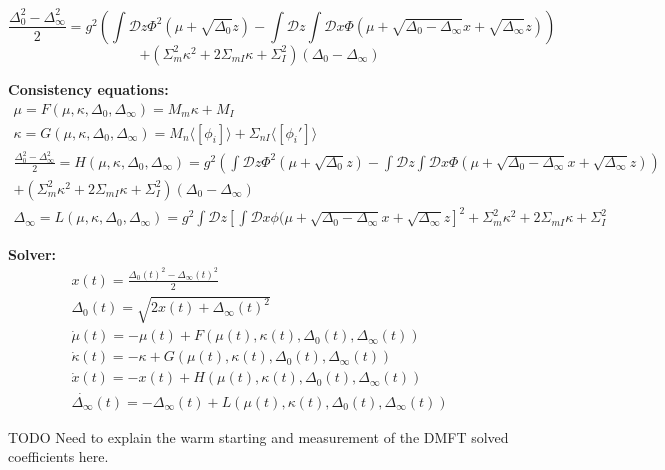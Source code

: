 \documentclass[11pt]{article}
\begin{document}
\[\frac{\Delta_0^2-\Delta_\infty^2}{2} = g^2 \left( \int \mathcal{D}z \Phi^2(\mu + \sqrt{\Delta_0}z) - \int \mathcal{D}z \int \mathcal{D}x \Phi(\mu + \sqrt{\Delta_0 - \Delta_\infty}x + \sqrt{\Delta_\infty}z)  \right) \] 
\[+ (\Sigma_m^2 \kappa^2 + 2\Sigma_{mI} \kappa + \Sigma_I^2)(\Delta_0-\Delta_\infty)\]

\textbf{Consistency equations:} \\ 
\begin{equation}
\begin{split}
\mu = F(\mu, \kappa, \Delta_0, \Delta_\infty) = M_m \kappa + M_I \\
\kappa = G(\mu, \kappa, \Delta_0, \Delta_\infty) = M_n \langle \left[ \phi_i \right] \rangle + \Sigma_{nI} \langle \left[ \phi_i' \right] \rangle \\
\frac{\Delta_0^2-\Delta_\infty^2}{2} = H(\mu, \kappa, \Delta_0, \Delta_\infty) = g^2 \left( \int \mathcal{D}z \Phi^2(\mu + \sqrt{\Delta_0}z) - \int \mathcal{D}z \int \mathcal{D}x \Phi(\mu + \sqrt{\Delta_0 - \Delta_\infty}x + \sqrt{\Delta_\infty}z)  \right) \\
+ (\Sigma_m^2 \kappa^2 + 2\Sigma_{mI} \kappa + \Sigma_I^2)(\Delta_0-\Delta_\infty) \\
\Delta_\infty = L(\mu, \kappa, \Delta_0, \Delta_\infty)  = g^2 \int \mathcal{D}z \left[ \int \mathcal{D}x \phi(\mu + \sqrt{\Delta_0 - \Delta_\infty}x + \sqrt{\Delta_\infty}z \right]^2 + \Sigma_m^2 \kappa^2 + 2\Sigma_{mI} \kappa + \Sigma_I^2
\end{split} 
\end{equation}

\textbf{Solver:}
\begin{equation}
\begin{split}
x(t) = \frac{\Delta_0(t)^2-\Delta_\infty(t)^2}{2} \\
\Delta_0(t) = \sqrt{2x(t) + \Delta_\infty(t)^2} \\
\dot{\mu}(t) = -\mu(t) + F(\mu(t), \kappa(t), \Delta_0(t), \Delta_\infty(t)) \\
\dot{\kappa}(t) = -\kappa + G(\mu(t), \kappa(t), \Delta_0(t), \Delta_\infty(t)) \\
\dot{x}(t) = -x(t) + H(\mu(t), \kappa(t), \Delta_0(t), \Delta_\infty(t)) \\
\dot{\Delta_\infty}(t) = -\Delta_\infty(t) + L(\mu(t), \kappa(t), \Delta_0(t), \Delta_\infty(t))
\end{split}
\end{equation}

TODO Need to explain the warm starting and measurement of the DMFT solved coefficients here.
\end{document}
